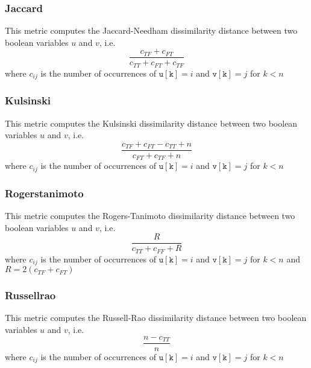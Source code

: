 
\subsubsection{Jaccard}
This metric computes the Jaccard-Needham dissimilarity distance between two boolean variables $u$ and $v$, i.e.
\begin{equation}
  \frac{c_{TF} + c_{FT}}{c_{TT} + c_{FT} + c_{TF}}
\end{equation}
where $c_{ij}$ is the number of occurrences of $\mathtt{u[k]} = i$ and $\mathtt{v[k]} = j$ for $k < n$


\subsubsection{Kulsinski}
This metric computes the Kulsinski dissimilarity distance between two boolean variables $u$ and $v$, i.e.
\begin{equation}
  \frac{c_{TF} + c_{FT} - c_{TT} + n}{c_{FT} + c_{TF} + n}
\end{equation}
where $c_{ij}$ is the number of occurrences of $\mathtt{u[k]} = i$ and $\mathtt{v[k]} = j$ for $k < n$


\subsubsection{Rogerstanimoto}
This metric computes the Rogers-Tanimoto dissimilarity distance between two boolean variables $u$ and $v$, i.e.
\begin{equation}
  \frac{R}{c_{TT} + c_{FF} + R}
\end{equation}
where $c_{ij}$ is the number of occurrences of $\mathtt{u[k]} = i$ and $\mathtt{v[k]} = j$
for $k < n$ and $R = 2(c_{TF} + c_{FT})$


\subsubsection{Russellrao}
This metric computes the Russell-Rao dissimilarity distance between two boolean variables $u$ and $v$, i.e.
\begin{equation}
  \frac{n - c_{TT}}{n}
\end{equation}
where $c_{ij}$ is the number of occurrences of $\mathtt{u[k]} = i$ and $\mathtt{v[k]} = j$ for $k < n$

